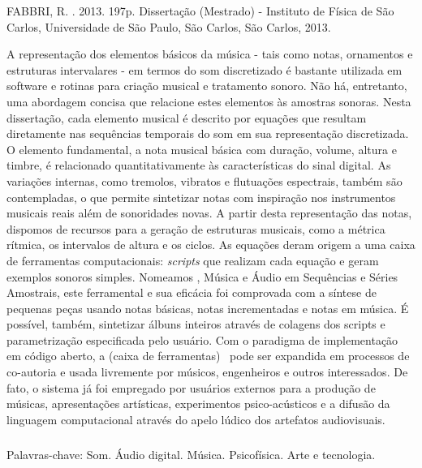 \begin{resumo2}
\vspace{-10mm}
FABBRI, R. \textbf{\ABNTtitulodata}. 2013. 197p. Dissertação (Mestrado) - Instituto de Física de São Carlos, Universidade de São Paulo, São Carlos, São Carlos, 2013.
\vspace{15mm}

A representação dos elementos básicos da música - tais como notas, ornamentos e estruturas intervalares - em termos do som discretizado é bastante utilizada em software e rotinas para criação musical e tratamento sonoro. Não há, entretanto, uma abordagem concisa que relacione estes elementos às amostras sonoras. Nesta dissertação, cada elemento musical é descrito por equações que resultam diretamente nas sequências temporais do som em sua representação discretizada. O elemento fundamental, a nota musical básica com duração, volume, altura e timbre, é relacionado quantitativamente às características do sinal digital. As variações internas, como tremolos, vibratos e flutuações espectrais, também são contempladas, o que permite sintetizar notas com inspiração nos instrumentos musicais reais além de sonoridades novas. A partir desta representação das notas, dispomos de recursos para a geração de estruturas musicais, como a métrica rítmica, os intervalos de altura e os ciclos. As equações deram origem a uma caixa de ferramentas computacionais: \emph{scripts} que realizam cada equação e geram exemplos sonoros simples. Nomeamos \massa, Música e Áudio em Sequências e Séries Amostrais, este ferramental e sua eficácia foi comprovada com a síntese de pequenas peças usando notas básicas, notas incrementadas e notas em música. É possível, também, sintetizar álbuns inteiros através de colagens dos scripts e parametrização especificada pelo usuário. Com o paradigma de implementação em código aberto, a (caixa de ferramentas) \massa\  pode ser expandida em processos de co-autoria e usada livremente por músicos, engenheiros e outros interessados. De fato, o sistema já foi empregado por usuários externos para a produção de músicas, apresentações artísticas, experimentos psico-acústicos e a difusão da linguagem computacional através do apelo lúdico dos artefatos audiovisuais.


$\phantom{linha em branco}$\\
Palavras-chave: Som. Áudio digital. Música. Psicofísica. Arte e tecnologia.

\end{resumo2}


\afterpage{\blankpage}

